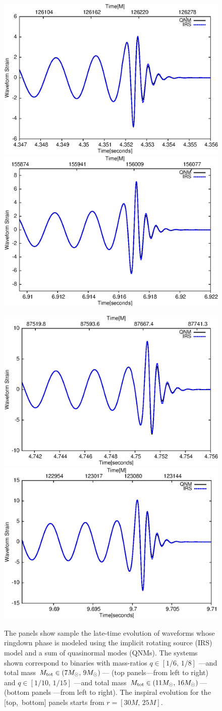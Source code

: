 \begin{figure}[ht]
\centerline{
\includegraphics[height=0.35\textwidth,  clip]{figures/imrimri/QNMvsIRSm1m6.eps}
\includegraphics[height=0.35\textwidth,  clip]{figures/imrimri/QNMvsIRSm1m8.eps}
}
\centerline{
\includegraphics[height=0.35\textwidth,  clip]{figures/imrimri/QNMvsIRSm1m10.eps}
\includegraphics[height=0.35\textwidth,  clip]{figures/imrimri/QNMvsIRSm1m15.eps}
}
\caption{The panels show sample the late-time evolution of waveforms whose ringdown phase is modeled using the implicit rotating source (IRS) model and a sum of quasinormal modes (QNMs). The systems shown correspond to binaries with mass-ratios \(q\in[1/6,\,1/8]\) ---and total mass  \(M_{{\rm{tot}}}\in( 7M_{\odot},\, 9M_{\odot}) \)--- (top panels---from left to right) and \(q\in[1/10,\, 1/15]\)  ---and total mass  \(M_{{\rm{tot}}}\in( 11M_{\odot},\, 16M_{\odot}) \)--- (bottom panels ---from left to right). The inspiral evolution for the [top,\, bottom] panels starts from  \(r=[30M,\, 25M]\). }
\label{QNMvsIRS}
\end{figure}


